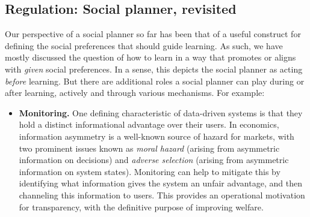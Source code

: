 \subsection{Regulation: Social planner, revisited} \label{sec:regulation}
Our perspective of a social planner so far has been that
of a useful construct for defining the social preferences that should guide learning.
As such, we have mostly discussed the question of how to learn in a way that promotes or aligns with \emph{given} social preferences.
In a sense, this depicts the social planner as acting \emph{before} learning.
But there are additional roles a social planner can play during or after learning, actively and through various mechanisms. For example:
\squeeze
\begin{itemize}[leftmargin=1em,topsep=0em,itemsep=0.3em]

\item \textbf{Monitoring.}
One defining characteristic of data-driven systems
is that they hold a distinct informational advantage over their users.
In economics, information asymmetry is a well-known source of hazard for markets, with two prominent issues known as \emph{moral hazard} \citep{holmstrom1979moral} (arising from asymmetric information on decisions) and \emph{adverse selection} \citep{akerlof1978market} (arising from asymmetric information on system states). 
Monitoring can help to mitigate this by identifying what information gives the system an unfair advantage, and then channeling this information to users.
This provides an operational motivation for transparency,
with the definitive purpose of improving welfare.





\end{itemize}
